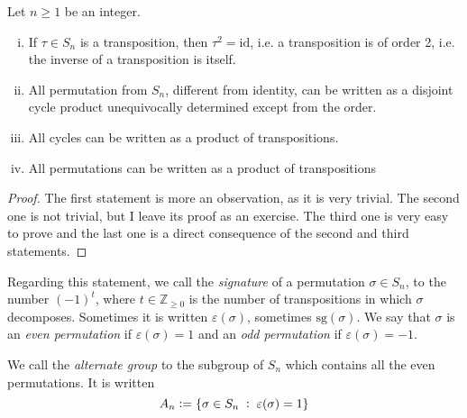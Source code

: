 \documentclass[../main.tex]{subfiles}
\begin{document}
\begin{prop}\label{prop:symmetricgroup} Let $n\geq 1$ be an integer.
\begin{enumerate}[(i)]
    \item If $\tau\in S_n$ is a transposition, then $\tau^2 = \mathrm{id}$, i.e. a transposition is of order 2, i.e. the inverse of a transposition is itself.
    \item All permutation from $S_n$, different from identity, can be written as a disjoint cycle product unequivocally determined except from the order. 
    \item All cycles can be written as a product of transpositions.
    \item All permutations can be written as a product of transpositions
\end{enumerate}
\end{prop}
\begin{proof}
The first statement is more an observation, as it is very trivial. The second one is not trivial, but I leave its proof as an exercise. The third one is very easy to prove and the last one is a direct consequence of the second and third statements.
\end{proof}

Regarding this statement, we call the \textit{signature} of a permutation $\sigma\in S_n$, to the number $(-1)^t$, where $t\in \mathbb{Z}_{\geq 0}$ is the number of transpositions in which $\sigma$ decomposes. Sometimes it is written $\varepsilon(\sigma)$, sometimes $\mathrm{sg}(\sigma)$. We say that $\sigma$ is an \textit{even permutation} if $\varepsilon(\sigma) = 1$ and an \textit{odd permutation} if $\varepsilon(\sigma) = -1$.

\begin{defi}
 We call the \textit{alternate group} to the subgroup of $S_n$ which contains all the even permutations. It is written
\begin{equation}
    \notag
    A_n:=\{\sigma\in S_n\;:\;\varepsilon(\sigma) = 1\}
\end{equation}
\end{defi}
\end{document}
